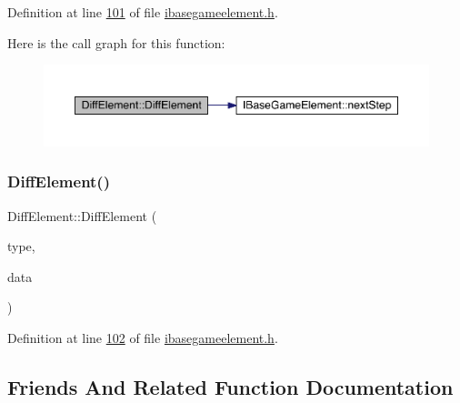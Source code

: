 Definition at line \hyperlink{a00047_source_l00101}{101} of file \hyperlink{a00047_source}{ibasegameelement.\+h}.

Here is the call graph for this function\+:
\nopagebreak
\begin{figure}[H]
\begin{center}
\leavevmode
\includegraphics[width=350pt]{d5/d4e/a00141_abb725fa0a448bf536959a5c469556599_cgraph}
\end{center}
\end{figure}
\mbox{\label{a00141_a82e8ecd785a9d06708c42f128b7aaf09}} 
\subsubsection{\texorpdfstring{Diff\+Element()}{DiffElement()}\hspace{0.1cm}{\footnotesize\ttfamily [2/2]}}
{\footnotesize\ttfamily Diff\+Element\+::\+Diff\+Element (\begin{DoxyParamCaption}\item[{\hyperlink{a00047_ab32e61d383765a32bc5f9efebb4b9f55}{e\+Diff\+Type}}]{type,  }\item[{\hyperlink{a00137}{I\+Base\+Game\+Element} $\ast$}]{data }\end{DoxyParamCaption})\hspace{0.3cm}{\ttfamily [inline]}}



Definition at line \hyperlink{a00047_source_l00102}{102} of file \hyperlink{a00047_source}{ibasegameelement.\+h}.



\subsection{Friends And Related Function Documentation}
\mbox{\label{a00141_a68d5973a4f23de0696d5c164b9a14397}} 
